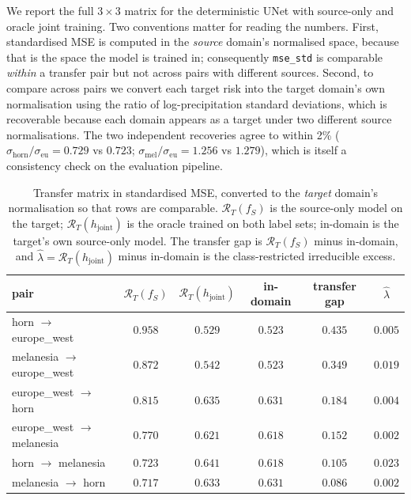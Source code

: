 \documentclass{article}
\begin{document}
We report the full $3\times3$ matrix for the deterministic UNet with
source-only and oracle joint training. Two conventions matter for
reading the numbers. First, standardised MSE is computed in the
\emph{source} domain's normalised space, because that is the space the
model is trained in; consequently \texttt{mse\_std} is comparable
\emph{within} a transfer pair but not across pairs with different
sources. Second, to compare across pairs we convert each target risk
into the target domain's own normalisation using the ratio of
log-precipitation standard deviations, which is recoverable because
each domain appears as a target under two different source
normalisations. The two independent recoveries agree to within 2\%
($\sigma_{\text{horn}}/\sigma_{\text{eu}} = 0.729$ vs $0.723$;
$\sigma_{\text{mel}}/\sigma_{\text{eu}} = 1.256$ vs $1.279$), which is
itself a consistency check on the evaluation pipeline.

\begin{table}[t]
\centering
\small
\begin{tabular}{lccccc}
\toprule
pair & $\mathcal{R}_T(f_S)$ & $\mathcal{R}_T(h_{\text{joint}})$ &
in-domain & transfer gap & $\widehat{\lambda}$ \\
\midrule
horn $\to$ europe\_west      & $0.958$ & $0.529$ & $0.523$ & $0.435$ & $0.005$ \\
melanesia $\to$ europe\_west & $0.872$ & $0.542$ & $0.523$ & $0.349$ & $0.019$ \\
europe\_west $\to$ horn      & $0.815$ & $0.635$ & $0.631$ & $0.184$ & $0.004$ \\
europe\_west $\to$ melanesia & $0.770$ & $0.621$ & $0.618$ & $0.152$ & $0.002$ \\
horn $\to$ melanesia         & $0.723$ & $0.641$ & $0.618$ & $0.105$ & $0.023$ \\
melanesia $\to$ horn         & $0.717$ & $0.633$ & $0.631$ & $0.086$ & $0.002$ \\
\bottomrule
\end{tabular}
\caption{Transfer matrix in standardised MSE, converted to the
\emph{target} domain's normalisation so that rows are comparable.
$\mathcal{R}_T(f_S)$ is the source-only model on the target;
$\mathcal{R}_T(h_{\text{joint}})$ is the oracle trained on both label
sets; in-domain is the target's own source-only model. The transfer gap
is $\mathcal{R}_T(f_S)$ minus in-domain, and
$\widehat{\lambda} = \mathcal{R}_T(h_{\text{joint}})$ minus in-domain is
the class-restricted irreducible excess.}
\label{tab:budget}
\end{table}
\end{document}
